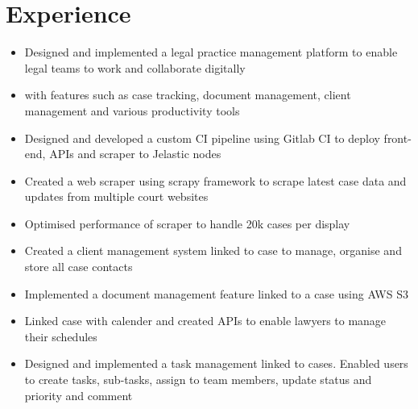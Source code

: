 \documentclass[]{resume}
\begin{document}
\begin{minipage}[t]{0.66\textwidth} 


\section{Experience}

\begin{itemize}
    \item Designed and implemented a legal practice management platform to enable legal teams to work and collaborate digitally
    \item with features such as case tracking, document management, client management and various productivity tools
    \item Designed and developed a custom CI pipeline using Gitlab CI to deploy front-end, APIs and scraper to Jelastic nodes
    \item Created a web scraper using scrapy framework to scrape latest case data and updates from multiple court websites
    \item Optimised performance of scraper to handle 20k cases per display
    \item Created a client management system linked to case to manage, organise and store all case contacts
    \item Implemented a document management feature linked to a case using AWS S3
    \item Linked case with calender and created APIs to enable lawyers to manage their schedules
    \item Designed and implemented a task management linked to cases. Enabled users to create tasks, sub-tasks, assign to team members, update status and priority and comment
\end{itemize}
\sectionsep


\end{minipage}
\end{document}
